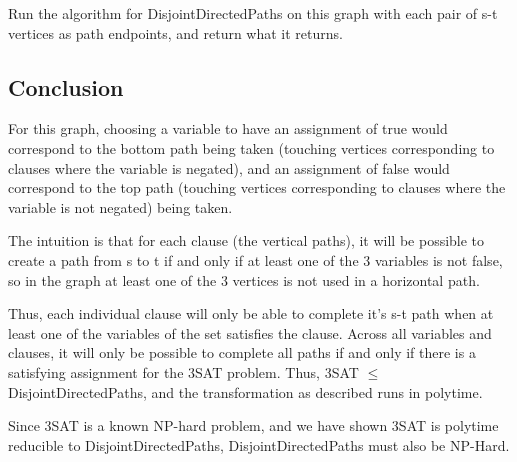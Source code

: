 \documentclass[a4paper]{article}
\begin{document}
Run the algorithm for DisjointDirectedPaths on this graph with each pair of s-t vertices as path endpoints, and return what it returns.

\subsection{Conclusion}
For this graph, choosing a variable to have an assignment of true would correspond to the bottom path being taken (touching vertices corresponding to clauses where the variable is negated), and an assignment of false would correspond to the top path (touching vertices corresponding to clauses where the variable is not negated) being taken.

The intuition is that for each clause (the vertical paths), it will be possible to create a path from s to t if and only if at least one of the 3 variables is not false, so in the graph at least one of the 3 vertices is not used in a horizontal path.

Thus, each individual clause will only be able to complete it's s-t path when at least one of the variables of the set satisfies the clause. Across all variables and clauses, it will only be possible to complete all paths if and only if there is a satisfying assignment for the 3SAT problem. Thus, 3SAT $\leq$ DisjointDirectedPaths, and the transformation as described runs in polytime.

Since 3SAT is a known NP-hard problem, and we have shown 3SAT is polytime reducible to DisjointDirectedPaths, DisjointDirectedPaths must also be NP-Hard.
\end{document}
